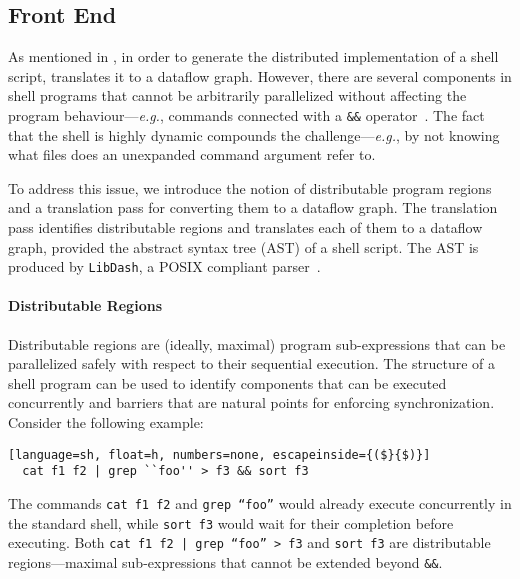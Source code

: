 \documentclass[acmsmall,10pt,review,anonymous]{acmart}
\newcommand{\eg}{{\em e.g.}, }
\newcommand{\ttt}[1]{\texttt{\small #1}}
\newcommand{\kk}[1]{[{\color{magenta}#1 --- kk}]}
\begin{document}
\subsection{Front End}
\label{front-end}

As mentioned in , in order to generate the distributed implementation of a shell script, \sys translates it to a dataflow graph.
However, there are several components in shell programs that cannot be arbitrarily parallelized without affecting the program behaviour---\eg commands connected with a \ttt{\&\&} operator~.
The fact that the shell is highly dynamic compounds the challenge---\eg by not knowing what files does an unexpanded command argument refer to.


To address this issue, we introduce the notion of distributable program regions and a translation pass for converting them to a dataflow graph.
The translation pass identifies distributable regions and translates each of them to a dataflow graph, provided the abstract syntax tree (AST) of a shell script.
The AST is produced by \ttt{LibDash}, a POSIX compliant parser~\cite{libdash}.

\paragraph{Distributable Regions}
%
%
Distributable regions are (ideally, maximal) program sub-expressions that can be parallelized safely with respect to their sequential execution.
The structure of a shell program can be used to identify components that can be executed concurrently and barriers that are natural points for enforcing synchronization.
Consider the following example:

\begin{lstlisting}[language=sh, float=h, numbers=none, escapeinside={($}{$)}]
  cat f1 f2 | grep ``foo'' > f3 && sort f3 
\end{lstlisting}

\noindent
The commands \ttt{cat f1 f2} and \ttt{grep ``foo''} would already execute concurrently in the standard shell, while \ttt{sort f3} would wait for their completion before executing.
Both \ttt{cat f1 f2 | grep ``foo'' > f3} and \ttt{sort f3} are distributable regions---maximal sub-expressions that cannot be extended beyond \ttt{\&\&}.
\end{document}
